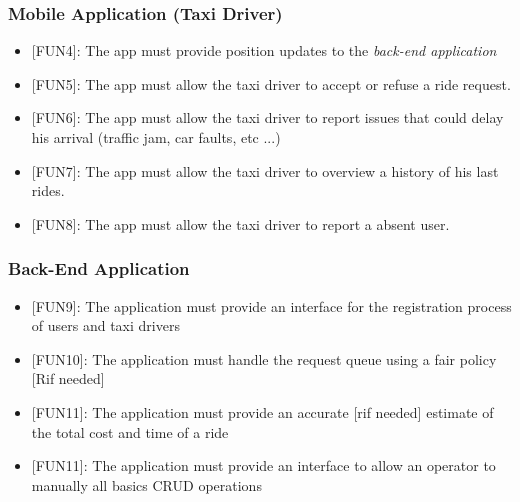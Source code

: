 \documentclass[12pt, a4paper]{article}
\begin{document}
\subsubsection{Mobile Application (Taxi Driver)} %
\label{ssub:mobile_application_}
\begin{itemize}
	\item {[FUN4\label{itm:FUN4}]}: The app must provide position updates to the \emph{back-end application}
	\item {[FUN5\label{itm:FUN5}]}: The app must allow the taxi driver to accept or refuse a ride request.
	\item {[FUN6\label{itm:FUN6}]}: The app must allow the taxi driver to report issues that could delay his arrival (traffic jam, car faults, etc ...)
	\item {[FUN7\label{itm:FUN7}]}: The app must allow the taxi driver to overview a history of his last rides.
	\item {[FUN8\label{itm:FUN8}]}: The app must allow the taxi driver to report a absent user.
\end{itemize}

\subsubsection{Back-End Application} 
\label{ssub:back_end_application}
\begin{itemize}
	\item {[FUN9\label{itm:FUN9}]}: The application must provide an interface for the registration process of users and taxi drivers
	\item {[FUN10\label{itm:FUN10}]}: The application must handle the request queue using a fair policy [Rif needed]
	\item {[FUN11\label{itm:FUN11}]}: The application must provide an accurate [rif needed] estimate of the total cost and time of a ride
	\item {[FUN11\label{itm:FUN12}]}: The application must provide an interface to allow an operator to manually all basics CRUD operations

\end{itemize}
\end{document}
